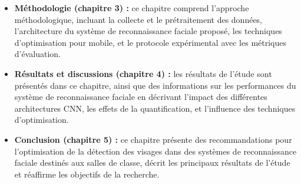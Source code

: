 \begin{onehalfspace}
\begin{itemize}
    \item \textbf{Méthodologie (chapitre 3) :} ce chapitre comprend l'approche méthodologique, incluant la collecte et le prétraitement des données, l'architecture du système de reconnaissance faciale proposé, les techniques d'optimisation pour mobile, et le protocole expérimental avec les métriques d'évaluation.
    
    \item \textbf{Résultats et discussions (chapitre 4) :} les résultats de l'étude sont présentés dans ce chapitre, ainsi que des informations sur les performances du système de reconnaissance faciale en décrivant l'impact des différentes architectures CNN, les effets de la quantification, et l'influence des techniques d'optimisation.
    
    \item \textbf{Conclusion (chapitre 5) :} ce chapitre présente des recommandations pour l'optimisation de la détection des visages dans des systèmes de reconnaissance faciale destinés aux salles de classe, décrit les principaux résultats de l'étude et réaffirme les objectifs de la recherche.
\end{itemize}
\end{onehalfspace} 